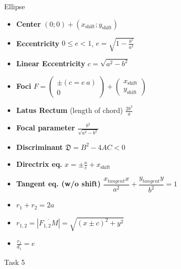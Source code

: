 \documentclass[aspectratio=169]{beamer}
\newcommand{\shf}{\text{shift}}
\begin{document}
\begin{frame}[t]{Ellipse}
\begin{multicols}{3}
\begin{itemize}
            \item \textbf{Center} $(0;0) + (x_{\shf};y_{\shf})$
            \item \textbf{Eccentricity} $0 \leq e < 1$, $e = \sqrt{1 - \frac{b^2}{a^2}}$
            \item \textbf{Linear Eccentricity} $c = \sqrt{a^2-b^2}$
            \item \textbf{Foci} $F = \begin{pmatrix} \pm(c= e\ a)\\ 0 \end{pmatrix} + \begin{pmatrix} x_{\shf}\\y_{\shf} \end{pmatrix}$
            \item \textbf{Latus Rectum} (length of chord) $\frac{2b^2}{a}$
            \item \textbf{Focal parameter}  $\frac{b^2}{\sqrt{a^2-b^2}}$
            \item \textbf{Discriminant} $\mathfrak{D} = B^2 - 4AC < 0$
            \item \textbf{Directrix eq.} $x = \pm \frac{a}{e} + x_{\shf}$
            \item \textbf{Tangent eq. (w/o shift)} $\dfrac{x_{tangent} x}{a^2}+\dfrac{y_{tangent} y}{b^2}=1$
            \item $r_1 + r_2 = 2a$
            \item $r_{1,2} = |\overline{F_{1,2}M}|=\sqrt{(x \pm c)^2+y^2}$
            \item $\frac{r_1}{d_1}=e$
            \end{itemize}
    \end{multicols}
    \end{frame}

    \begin{frame}[t]{Task 5}
        \framesubtitle{}
    \end{frame}
\end{document}
